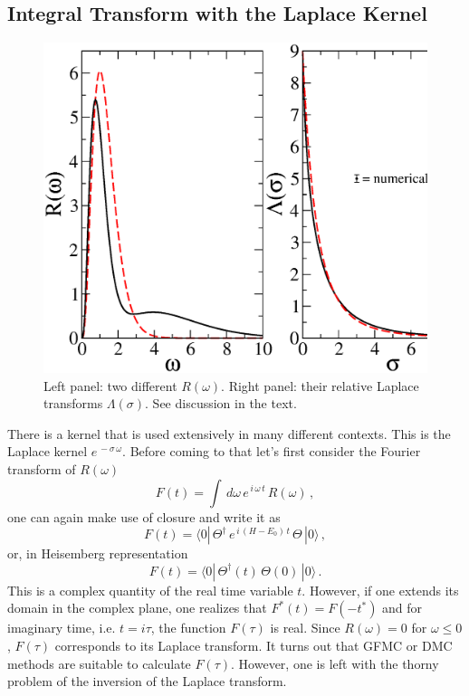 \subsection{Integral Transform with the Laplace Kernel}\label{sec:LAPLACE} 
\begin{figure}
\sidecaption
\includegraphics[scale=.65]{Chapter7-figures/fig3.eps}
%
%
\caption{Left panel: two different $R(\omega)$. Right panel: their relative Laplace transforms $\Lambda(\sigma)$. 
See discussion in the text.}
\label{fig:3}       %
\end{figure}
There is a kernel that is used extensively in many different contexts. This is the Laplace kernel $e^{\,-\sigma\,\omega}$. 
Before coming to that let's  first  consider  the Fourier transform of  $R(\omega)$ 
\begin{equation}
F(t)=\int\, d\omega\, e^{\,i\, \omega\, t}\, R(\omega)\,,
\end{equation}
one can again make use of closure and write it as  
\begin{equation}
F(t)=\langle 0|\,\Theta^\dagger\, e^{\,i\, (H-E_0)\, t} \,\Theta\,|0\rangle\,,
\end{equation}
or, in Heisemberg representation  
\begin{equation}
F(t)=\langle 0|\,\Theta^\dagger(t) \,\Theta(0)\,|0\rangle\,.
\end{equation}
This is a complex quantity of the real time variable $t$. However, if one extends its domain in the complex plane, one realizes 
that $F^*(t)=F(-t^*)$ and for imaginary time, i.e. $t=i \tau$,  the function $F(\tau)$ is real. Since $R(\omega) = 0$ for $\omega\leq 0$,
$F(\tau)$  corresponds to its Laplace transform. It turns out that GFMC or DMC methods are suitable
to calculate $F(\tau)$. However, one is left with the thorny problem of the inversion of the Laplace transform.

